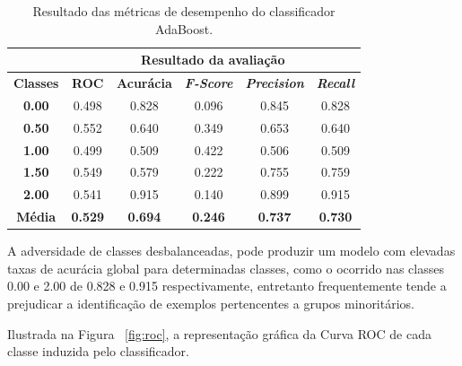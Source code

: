 \begin{table}[H]
\centering
\begin{tabular}{c|c|c|c|c|c|}
\cline{2-6}
 & \multicolumn{5}{c|}{\textbf{Resultado da avaliação}} \\ \hline
\multicolumn{1}{|c|}{\textbf{Classes}} & \textbf{ROC} & \textbf{Acurácia} & \textit{\textbf{F-Score}} & \textit{\textbf{Precision}} & \textit{\textbf{Recall}} \\ \hline
\multicolumn{1}{|c|}{\textbf{0.00}}  & 0.498 & 0.828 & 0.096 & 0.845 & 0.828 \\ \hline
\multicolumn{1}{|c|}{\textbf{0.50}}  & 0.552 & 0.640 & 0.349 & 0.653 & 0.640 \\ \hline
\multicolumn{1}{|c|}{\textbf{1.00}}  & 0.499 & 0.509 & 0.422 & 0.506 & 0.509 \\ \hline
\multicolumn{1}{|c|}{\textbf{1.50}}  & 0.549 & 0.579 & 0.222 & 0.755 & 0.759 \\ \hline
\multicolumn{1}{|c|}{\textbf{2.00}}  & 0.541 & 0.915 & 0.140 & 0.899 & 0.915 \\ \hline
\multicolumn{1}{|c|}{\textbf{Média}} & \textbf{0.529} & \textbf{0.694} & \textbf{0.246} & \textbf{0.737} & \textbf{0.730} \\ \hline
\end{tabular}
\caption{Resultado das métricas de desempenho do classificador AdaBoost.}
\label{tab:evaluation_result}
\end{table}

A adversidade de classes desbalanceadas, pode produzir um modelo com elevadas taxas de acurácia global para determinadas classes, como o ocorrido nas classes 0.00 e 2.00 de 0.828 e 0.915 respectivamente, entretanto frequentemente tende a prejudicar a identificação de exemplos pertencentes a grupos minoritários.

Ilustrada na Figura ~\ref{fig:roc}, a representação gráfica da Curva ROC de cada classe induzida pelo classificador.

